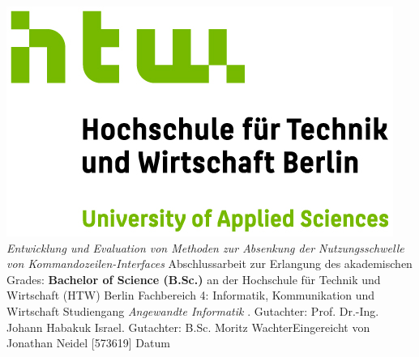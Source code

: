 \documentclass[oneside,bibliography=totocnumbered,BCOR=5mm]{scrbook}
\begin{document}
\begin{titlepage}
\begin{center}
\includegraphics{htw-logo.jpg}
\linebreak[4]
\linebreak[4]
\linebreak[4]
\linebreak[4]
\textit{\large Entwicklung und Evaluation von Methoden zur Absenkung der Nutzungsschwelle von Kommandozeilen-Interfaces}
\linebreak[4]
\linebreak[4]
\linebreak[4]
Abschlussarbeit
\linebreak[4]
\linebreak[4]
zur Erlangung des akademischen Grades:
\linebreak[4]
\linebreak[4]
\textbf{Bachelor of Science (B.Sc.)}
\linebreak[4]
\linebreak[4]
an der
\linebreak[4]
\linebreak[4]
Hochschule f\"ur Technik und Wirtschaft (HTW) Berlin
\linebreak[4]
Fachbereich 4: Informatik, Kommunikation und Wirtschaft
\linebreak[4]
Studiengang \textit{Angewandte Informatik}
\linebreak[4]
\linebreak[4]
. Gutachter: Prof. Dr.-Ing. Johann Habakuk Israel. Gutachter: B.Sc. Moritz Wachter\linebreak[4]
\linebreak[4]
\linebreak[4]
\linebreak[4]
\linebreak[4]
Eingereicht von Jonathan Neidel [573619]
\linebreak[4]
\linebreak[4]
\linebreak[4]
\linebreak[4]
Datum

\end{center}
\end{titlepage}
\newpage
\end{document}
